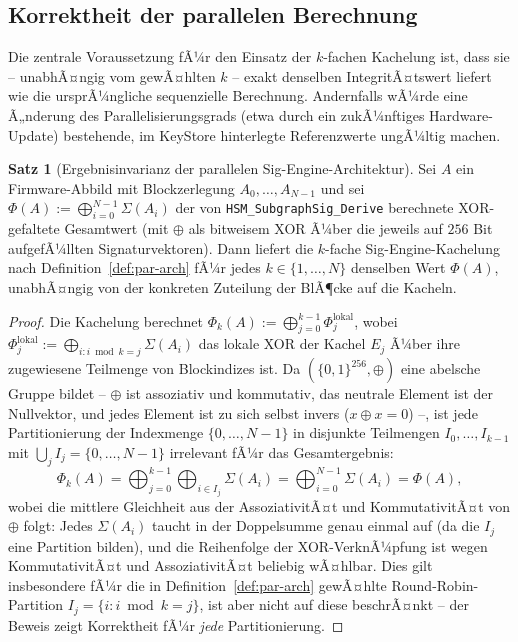 ﻿\documentclass[a4paper,12pt]{article}
\theoremstyle{definition}
\newtheorem{satz}{Satz}
\begin{document}
\subsection{Korrektheit der parallelen Berechnung}
\label{subsec:par-korrektheit}

Die zentrale Voraussetzung fÃ¼r den Einsatz der $k$-fachen Kachelung ist, dass sie -- unabhÃ¤ngig vom gewÃ¤hlten $k$ -- exakt denselben IntegritÃ¤tswert liefert wie die ursprÃ¼ngliche sequenzielle Berechnung. Andernfalls wÃ¼rde eine Ã„nderung des Parallelisierungsgrads (etwa durch ein zukÃ¼nftiges Hardware-Update) bestehende, im KeyStore hinterlegte Referenzwerte ungÃ¼ltig machen.

\begin{satz}[Ergebnisinvarianz der parallelen Sig-Engine-Architektur]
	\label{satz:par-invarianz}
	Sei $A$ ein Firmware-Abbild mit Blockzerlegung $A_0,\ldots,A_{N-1}$ und sei $\Phi(A) := \bigoplus_{i=0}^{N-1} \Sigma(A_i)$ der von \texttt{HSM\_SubgraphSig\_Derive} berechnete XOR-gefaltete Gesamtwert (mit $\oplus$ als bitweisem XOR Ã¼ber die jeweils auf $256$ Bit aufgefÃ¼llten Signaturvektoren). Dann liefert die $k$-fache Sig-Engine-Kachelung nach Definition~\ref{def:par-arch} fÃ¼r jedes $k \in \{1,\ldots,N\}$ denselben Wert $\Phi(A)$, unabhÃ¤ngig von der konkreten Zuteilung der BlÃ¶cke auf die Kacheln.
\end{satz}

\begin{proof}
	Die Kachelung berechnet $\Phi_k(A) := \bigoplus_{j=0}^{k-1} \Phi_j^{\mathrm{lokal}}$, wobei $\Phi_j^{\mathrm{lokal}} := \bigoplus_{i : i \bmod k = j} \Sigma(A_i)$ das lokale XOR der Kachel $E_j$ Ã¼ber ihre zugewiesene Teilmenge von Blockindizes ist. Da $(\{0,1\}^{256}, \oplus)$ eine abelsche Gruppe bildet -- $\oplus$ ist assoziativ und kommutativ, das neutrale Element ist der Nullvektor, und jedes Element ist zu sich selbst invers ($x \oplus x = 0$) --, ist jede Partitionierung der Indexmenge $\{0,\ldots,N-1\}$ in disjunkte Teilmengen $I_0,\ldots,I_{k-1}$ mit $\bigcup_j I_j = \{0,\ldots,N-1\}$ irrelevant fÃ¼r das Gesamtergebnis:
	\[
	\Phi_k(A) = \bigoplus_{j=0}^{k-1} \bigoplus_{i \in I_j} \Sigma(A_i) = \bigoplus_{i=0}^{N-1} \Sigma(A_i) = \Phi(A),
	\]
	wobei die mittlere Gleichheit aus der AssoziativitÃ¤t und KommutativitÃ¤t von $\oplus$ folgt: Jedes $\Sigma(A_i)$ taucht in der Doppelsumme genau einmal auf (da die $I_j$ eine Partition bilden), und die Reihenfolge der XOR-VerknÃ¼pfung ist wegen KommutativitÃ¤t und AssoziativitÃ¤t beliebig wÃ¤hlbar. Dies gilt insbesondere fÃ¼r die in Definition~\ref{def:par-arch} gewÃ¤hlte Round-Robin-Partition $I_j = \{i : i \bmod k = j\}$, ist aber nicht auf diese beschrÃ¤nkt -- der Beweis zeigt Korrektheit fÃ¼r \emph{jede} Partitionierung. \qedhere
\end{proof}
\end{document}

